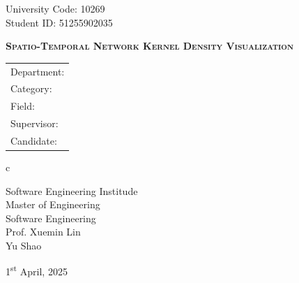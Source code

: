 \newpage

\pagestyle{empty}

\newline
\hspace*{\fill} {University Code: 10269}\\
\hspace*{\fill} {Student ID: 
51255902035
}%

\vskip 2cm

\begin{center}
    \vspace{1cm}
    {}
\end{center}

\vskip 3cm

\begin{center}
    \bfseries{\scshape{\huge Spatio-Temporal Network Kernel Density Visualization}}\\
\end{center}

\vskip 2cm {\large
        \begin{center}
            \begin{tabular}{l}
                Department:         \\
                Category:              \\
                Field: \\
                Supervisor:         \\
                Candidate:
            \end{tabular}
            \begin{tabular}c

                Software Engineering Institude \\
                \hline Master of Engineering\\
                \hline Software Engineering \\
                \hline Prof. Xuemin Lin \\
                \hline Yu Shao\\


                \hline
            \end{tabular}
        \end{center}}

\vskip 30mm

\begin{center}
    {\Large 1\textsuperscript{st} April, 2025}
\end{center}

\cleardoublepage